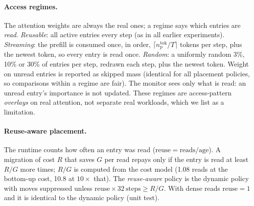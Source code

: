 \documentclass[10pt,a4paper]{article}
\begin{document}
\paragraph{Access regimes.} The attention weights are always the real ones; a regime says which entries are \emph{read}. \emph{Reusable}: all active entries every step (as in all earlier experiments). \emph{Streaming}: the prefill is consumed once, in order, $\lceil n_p^{\text{tok}}/T\rceil$ tokens per step, plus the newest token, so every entry is read once. \emph{Random}: a uniformly random 3\%, 10\% or 30\% of entries per step, redrawn each step, plus the newest token. Weight on unread entries is reported as skipped mass (identical for all placement policies, so comparisons within a regime are fair). The monitor sees only what is read: an unread entry's importance is not updated. These regimes are access-pattern \emph{overlays} on real attention, not separate real workloads, which we list as a limitation.

\paragraph{Reuse-aware placement.} The runtime counts how often an entry was read ($\text{reuse}=\text{reads}/\text{age}$). A migration of cost $R$ that saves $G$ per read repays only if the entry is read at least $R/G$ more times; $R/G$ is computed from the cost model (1.08 reads at the bottom-up cost, 10.8 at $10\times$ that). The \emph{reuse-aware} policy is the dynamic policy with moves suppressed unless $\text{reuse}\times 32\ \text{steps}\ge R/G$. With dense reads $\text{reuse}=1$ and it is identical to the dynamic policy (unit test).
\end{document}
